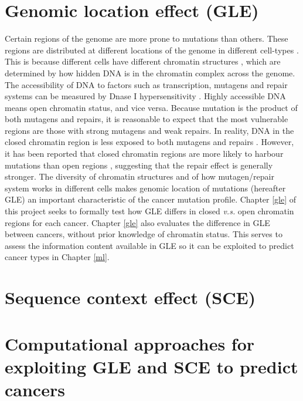 \section{Genomic location effect (GLE)}
\label{intro:gle}
Certain regions of the genome are more prone to mutations than others. These regions are distributed at different locations of the genome in different cell-types \citep{Polak2015}. This is because different cells have different chromatin structures \citep{Abascal2020ExpandedGenomes}, which are determined by how hidden DNA is in the chromatin complex across the genome. The accessibility of DNA to factors such as transcription, mutagens and repair systems can be measured by Dnase I hypersensitivity \citep[DHS;][]{Liu2019AApplications}. Highly accessible DNA means open chromatin status, and vice versa. Because mutation is the product of both \glspl{mutagen} and repairs, it is reasonable to expect that the most vulnerable regions are those with strong mutagens and weak repairs. In reality, DNA in the closed chromatin region is less exposed to both mutagens and repairs \citep[Figure \ref][]{Teng1997ExcisionSequences, Morse2002PhotoreactivationCerevisiae}. However, it has been reported that closed chromatin regions are more likely to harbour mutations than open regions \citep{Polak2015,Prendergast2007ChromatinGenome}, suggesting that the repair effect is generally stronger. The diversity of chromatin structures and of how mutagen/repair system works in different cells makes genomic location of mutations (hereafter GLE) an important characteristic of the cancer mutation profile. Chapter \ref{gle} of this project seeks to formally test how GLE differs in closed \textit{v.s.} open chromatin regions for each cancer. Chapter \ref{gle} also evaluates the difference in GLE between cancers, without prior knowledge of chromatin status. This serves to assess the information content available in GLE so it can be exploited to predict cancer types in Chapter \ref{ml}.

\section{Sequence context effect (SCE)}
\label{intro:sce}
\section{Computational approaches for exploiting GLE and SCE to predict cancers}
\label{intro:ml}